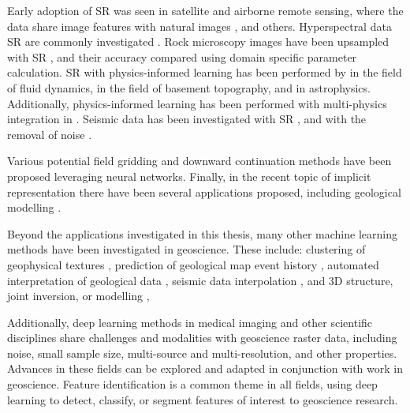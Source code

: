 Early adoption of SR was seen in satellite and airborne remote sensing, where the data share image features with natural images \parencite{lanarasSuperresolutionSentinel2Images2018,arunConvolutionalNetworkArchitectures2019,kawulokTrainingDeepNetworks2019}, and others.
Hyperspectral data SR are commonly investigated \parencite{yangHyperspectralImageClassification2018,arunCNNBasedSuperResolutionHyperspectral2020}.
Rock microscopy images have been upsampled with SR \parencite{niuInnovativeApplicationGenerative2020}, and their accuracy compared using domain specific parameter calculation.
SR with physics-informed learning has been performed by \textcite{bodeUsingPhysicsinformedEnhanced2021,jiangMeshfreeFlowNetPhysicsConstrainedDeep2020} in the field of fluid dynamics, \textcite{leongDeepBedMapDeepNeural2020} in the field of basement topography, and \textcite{jungbluthSingleframeSuperresolutionSolar2019} in astrophysics.
Additionally, physics-informed learning has been performed with multi-physics integration in \textcite{degen3DMultiphysicsUncertainty2022}.
Seismic data has been investigated with SR \parencite{liSuperresolutionSeismicVelocity2021}, and with the removal of noise \parencite{liDeepLearningSimultaneous2021}.

Various potential field gridding \parencite{naprstekApplicationsMachineLearning2019,wangDeepLearningGravity2019a} and downward continuation methods \parencite{liStableDownwardContinuation2023,yeHighprecisionDownwardContinuation2022} have been proposed leveraging neural networks.
Finally, in the recent topic of implicit representation there have been several applications proposed, including geological modelling \parencite{hillierGeoINRImplicitNeural2023}.

Beyond the applications investigated in this thesis, many other machine learning methods have been investigated in geoscience.
These include: clustering of geophysical textures \parencite{grujicGeophysicsNeuralNetworks2019}, prediction of geological map event history \parencite{guo3DGeologicalStructure2021}, automated interpretation of geological data \parencite{waldelandConvolutionalNeuralNetworks2018, babakhinSemisupervisedSegmentationSalt2019,dawsonImpactDatasetSize2023}, seismic data interpolation \parencite{wangDeeplearningbasedSeismicData2018}, and 3D structure, joint inversion, or modelling \parencite{guo3DGeologicalStructure2021},

Additionally, deep learning methods in medical imaging and other scientific disciplines share challenges and modalities with geoscience raster data, including noise, small sample size, multi-source and multi-resolution, and other properties.
Advances in these fields can be explored and adapted in conjunction with work in geoscience.
Feature identification is a common theme in all fields, using deep learning to detect, classify, or segment features of interest to geoscience research.

